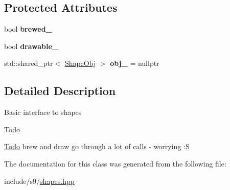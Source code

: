 \subsection*{\-Protected \-Attributes}
\begin{DoxyCompactItemize}
\item 
\hypertarget{classs9_1_1Shape_a16fce1e6a6920342f9da0ef0d611e3b2}{bool {\bfseries brewed\-\_\-}}\label{classs9_1_1Shape_a16fce1e6a6920342f9da0ef0d611e3b2}

\item 
\hypertarget{classs9_1_1Shape_ae986a572bf5750844c1d243e620ff02a}{bool {\bfseries drawable\-\_\-}}\label{classs9_1_1Shape_ae986a572bf5750844c1d243e620ff02a}

\item 
\hypertarget{classs9_1_1Shape_ace0e8a8ee82a37014630fd7b91cfcc66}{std\-::shared\-\_\-ptr$<$ \hyperlink{structs9_1_1ShapeObj}{\-Shape\-Obj} $>$ {\bfseries obj\-\_\-} = nullptr}\label{classs9_1_1Shape_ace0e8a8ee82a37014630fd7b91cfcc66}

\end{DoxyCompactItemize}


\subsection{\-Detailed \-Description}
\-Basic interface to shapes \begin{DoxyRefDesc}{\-Todo}
\item[\hyperlink{todo__todo000026}{\-Todo}]brew and draw go through a lot of calls -\/ worrying \-:\-S \end{DoxyRefDesc}


\-The documentation for this class was generated from the following file\-:\begin{DoxyCompactItemize}
\item 
include/s9/\hyperlink{shapes_8hpp}{shapes.\-hpp}\end{DoxyCompactItemize}
